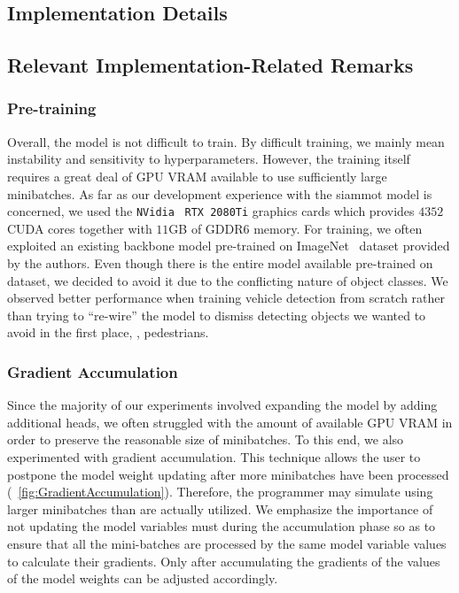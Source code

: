 \subsection{Implementation Details}


\subsection{Relevant Implementation-Related Remarks}

\subsubsection{Pre-training}

Overall, the model is not difficult to train. By difficult training, we mainly mean instability and sensitivity to hyperparameters. However, the training itself requires a great deal of GPU VRAM available to use sufficiently large minibatches. As far as our development experience with the \gls{siammot} model is concerned, we used the \texttt{NVidia}~\cite{webnvidia} \texttt{RTX 2080Ti} graphics cards which provides $4352$ CUDA cores together with $11$GB of GDDR6 memory. For training, we often exploited an existing backbone model pre-trained on ImageNet~\cite{deng2009imagenet} dataset provided by the authors. Even though there is the entire model available pre-trained on \mscoco{}~\cite{lin2014mscoco} dataset, we decided to avoid it due to the conflicting nature of object classes. We observed better performance when training vehicle detection from scratch rather than trying to ``re-wire'' the model to dismiss detecting objects we wanted to avoid in the first place, \egtext{}, pedestrians.

\subsubsection{Gradient Accumulation}

Since the majority of our experiments involved expanding the model by adding additional heads, we often struggled with the amount of available GPU VRAM in order to preserve the reasonable size of minibatches. To this end, we also experimented with gradient accumulation. This technique allows the user to postpone the model weight updating after more minibatches have been processed (\figtext{}~\ref{fig:GradientAccumulation}). Therefore, the programmer may simulate using larger minibatches than are actually utilized. We emphasize the importance of not updating the model variables must during the accumulation phase so as to ensure that all the mini-batches are processed by the same model variable values to calculate their gradients. Only after accumulating the gradients of the values of the model weights can be adjusted accordingly.

